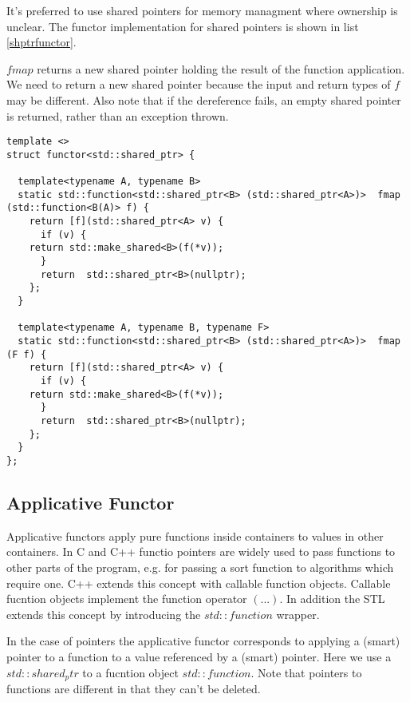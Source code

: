 \documentclass[12pt,fleqn]{article}
\begin{document}
It's preferred to use shared pointers for memory managment where ownership is unclear.
The functor implementation for shared pointers is shown in list \ref{shptrfunctor}. 

$fmap$ returns a new shared pointer holding the result of the function application.
We need to return a new shared pointer because the input and return types of $f$ may be different. 
Also note that if the dereference fails, an empty shared pointer is returned, rather than an exception thrown.


\begin{minipage}{\linewidth}
\begin{lstlisting}[caption=functor implemention for std::shared\_ptr, label=shptrfunctor]
template <>
struct functor<std::shared_ptr> {

  template<typename A, typename B>
  static std::function<std::shared_ptr<B> (std::shared_ptr<A>)>  fmap (std::function<B(A)> f) {
    return [f](std::shared_ptr<A> v) {
      if (v) {
	return std::make_shared<B>(f(*v)); 
      }
      return  std::shared_ptr<B>(nullptr);
    };
  }

  template<typename A, typename B, typename F>
  static std::function<std::shared_ptr<B> (std::shared_ptr<A>)>  fmap (F f) {
    return [f](std::shared_ptr<A> v) {
      if (v) {
	return std::make_shared<B>(f(*v)); 
      }
      return  std::shared_ptr<B>(nullptr);
    };
  }
};
\end{lstlisting}
\end{minipage}
   
%
\subsection{Applicative Functor}
%
%

Applicative functors apply pure functions inside containers to values in other containers.
In C and C++ functio pointers are widely used to pass functions to other parts of the program, e.g. for passing a sort function to algorithms which require one.
C++ extends this concept with callable function objects. Callable fucntion objects implement the function operator $(...)$.
In addition the STL extends this concept by introducing the $std::function$ wrapper.

In the case of pointers the applicative functor corresponds to applying a (smart) pointer to a function to a value referenced by a (smart) pointer.
Here we use a $std::shared_ptr$ to a fucntion object $std::function$.
Note that pointers to functions are different in that they can't be deleted.
\end{document}

